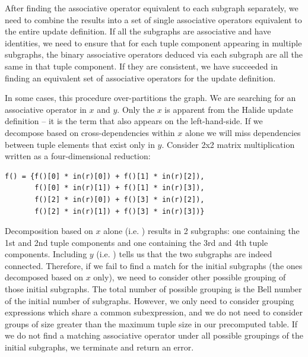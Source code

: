 After finding the associative operator equivalent to each subgraph separately, we need to combine the results into a set of single associative operators equivalent to the entire update definition. If all the subgraphs are associative and have identities, we need to ensure that for each tuple component appearing in multiple subgraphs, the binary associative operators deduced via each subgraph are all the same in that tuple component. If they are consistent, we have succeeded in finding an equivalent set of associative operators for the update definition.

In some cases, this procedure over-partitions the graph. We are searching for an associative operator in $x$ and $y$. Only the $x$ is apparent from the Halide update definition -- it is the term that also appears on the left-hand-side. If we decompose based on cross-dependencies within $x$ alone we will miss dependencies between tuple elements that exist only in $y$. Consider 2x2 matrix multiplication written as a four-dimensional reduction:

\begin{lstlisting}
f() = {f()[0] * in(r)[0]) + f()[1] * in(r)[2]),
       f()[0] * in(r)[1]) + f()[1] * in(r)[3]),
       f()[2] * in(r)[0]) + f()[3] * in(r)[2]),
       f()[2] * in(r)[1]) + f()[3] * in(r)[3])}
\end{lstlisting}

Decomposition based on $x$ alone (i.e. ) results in 2 subgraphs: one containing the 1st and 2nd tuple components and one containing the 3rd and 4th tuple components. Including $y$ (i.e. ) tells us that the two subgraphs are indeed connected. Therefore, if we fail to find a match for the initial subgraphs (the ones decomposed based on $x$ only), we need to consider other possible grouping of those initial subgraphs. The total number of possible grouping is the Bell number of the initial number of subgraphs. However, we only need to consider grouping expressions which share a common subexpression, and we do not need to consider groups of size greater than the maximum tuple size in our precomputed table. If we do not find a matching associative operator under all possible groupings of the initial subgraphs, we terminate and return an error.

